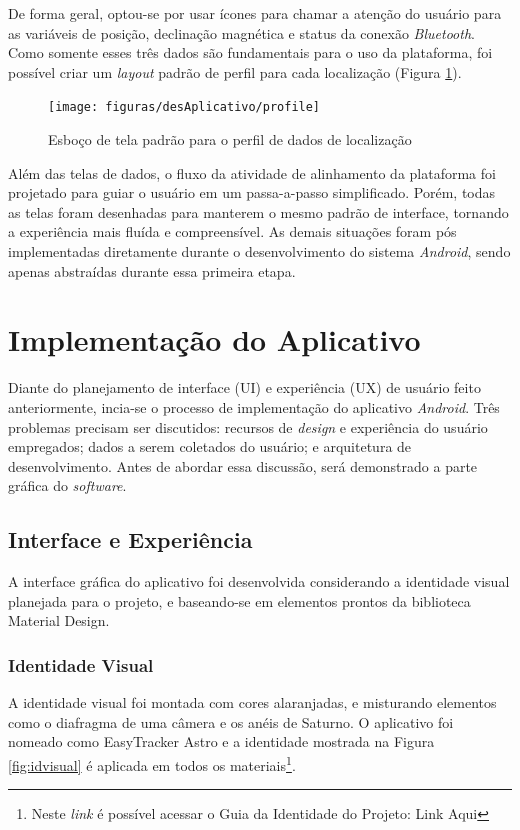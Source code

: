 De forma geral, optou-se por usar ícones para chamar a atenção do usuário para as variáveis de posição, declinação magnética e status da conexão \textit{Bluetooth}. Como somente esses três dados são fundamentais para o uso da plataforma, foi possível criar um \textit{layout} padrão de perfil para cada localização (Figura \ref{fig:layoutpadraoperfil}). 

\begin{figure}[!htb]
	\centering
	\caption{Esboço de tela padrão para o perfil de dados de localização}
	\texttt{[image: figuras/desAplicativo/profile]}
	\label{fig:layoutpadraoperfil}
\end{figure}

Além das telas de dados, o fluxo da atividade de alinhamento da plataforma foi projetado para guiar o usuário em um passa-a-passo simplificado. Porém, todas as telas foram desenhadas para manterem o mesmo padrão de interface, tornando a experiência mais fluída e compreensível. As demais situações foram pós implementadas diretamente durante o desenvolvimento do sistema \textit{Android}, sendo apenas abstraídas durante essa primeira etapa.

\section{Implementação do Aplicativo}

Diante do planejamento de interface (UI) e experiência (UX) de usuário feito anteriormente, incia-se o processo de implementação do aplicativo \textit{Android}. Três problemas precisam ser discutidos: recursos de \textit{design} e experiência do usuário empregados; dados a serem coletados do usuário; e arquitetura de desenvolvimento. Antes de abordar essa discussão, será demonstrado a parte gráfica do \textit{software}.

\subsection{Interface e Experiência}

A interface gráfica do aplicativo foi desenvolvida considerando a identidade visual planejada para o projeto, e baseando-se em elementos prontos da biblioteca Material Design.

\subsubsection{Identidade Visual}
A identidade visual foi montada com cores alaranjadas, e misturando elementos como o diafragma de uma câmera e os anéis de Saturno. O aplicativo foi nomeado como EasyTracker Astro e a identidade mostrada na Figura \ref{fig:idvisual} é aplicada em todos os materiais\footnote{Neste \textit{link} é possível acessar o Guia da Identidade do Projeto: Link Aqui}.

